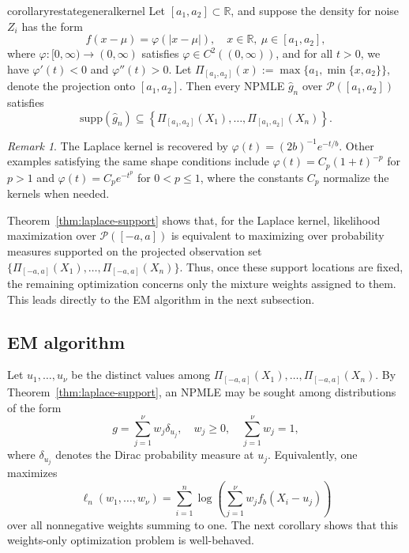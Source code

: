 \documentclass[english, 11pt]{article}
\newcommand{\supp}{\mathrm{supp}}
\theoremstyle{plain}
\theoremstyle{definition}
\theoremstyle{remark}
\newtheorem{remark}[theorem]{Remark}
\begin{document}
\begin{restatable}{corollary}{restategeneralkernel}\label{cor:general-kernel-support}
Let $[a_1,a_2]\subset\mathbb R$, and suppose the density for noise $Z_i$ has the form
\begin{equation*}
f(x-\mu)=\varphi(|x-\mu|), \quad x\in\mathbb R,\ \mu\in[a_1,a_2],
\end{equation*}
where $\varphi:[0,\infty)\to(0,\infty)$ satisfies $\varphi\in C^2((0,\infty))$, and for all $t>0$, we have
$\varphi'(t)<0$ and $\varphi''(t)>0$. Let $\Pi_{[a_1,a_2]}(x):=\max\{a_1,\min\{x,a_2\}\}$, denote the projection onto $[a_1,a_2]$. Then every NPMLE $\widehat g_n$ over $\mathcal P([a_1,a_2])$ satisfies
\begin{equation*}
\supp(\widehat g_n)\subseteq \left\{\Pi_{[a_1,a_2]}(X_1),\dots,\Pi_{[a_1,a_2]}(X_n)\right\}.
\end{equation*}
\end{restatable}

\begin{remark}
The Laplace kernel is recovered by $\varphi(t)=(2b)^{-1}e^{-t/b}$.
Other examples satisfying the same shape conditions include
$\varphi(t)=C_p(1+t)^{-p}$ for $p>1$ and
$\varphi(t)=C_p e^{-t^p}$ for $0<p\le 1$,
where the constants $C_p$ normalize the kernels when needed.
\end{remark}

Theorem~\ref{thm:laplace-support} shows that, for the Laplace kernel, likelihood maximization over $\mathcal P([-a,a])$ is equivalent to maximizing over probability measures supported on the projected observation set $\{\Pi_{[-a,a]}(X_1),\dots,\Pi_{[-a,a]}(X_n)\}$.
Thus, once these support locations are fixed, the remaining optimization concerns only the mixture weights assigned to them. This leads directly to the EM algorithm in the next subsection.

\subsection{EM algorithm}

Let $u_1,\dots,u_{\nu}$ be the distinct values among $\Pi_{[-a,a]}(X_1),\ldots,\Pi_{[-a,a]}(X_n)$.
By Theorem~\ref{thm:laplace-support}, an NPMLE may be sought among distributions of the form
\begin{equation*}
g=\sum_{j=1}^{\nu} w_j\delta_{u_j}, \quad w_j\ge 0,\quad \sum_{j=1}^{\nu} w_j=1,
\end{equation*}
where $\delta_{u_j}$ denotes the Dirac probability measure at $u_j$.
Equivalently, one maximizes
\begin{equation}\label{eq:finite-loglik}
\ell_n(w_1,\dots,w_{\nu})=\sum_{i=1}^n\log \left(\sum_{j=1}^{\nu} w_j f_b(X_i-u_j)\right)
\end{equation}
over all nonnegative weights summing to one. 
The next corollary shows that this weights-only optimization problem is well-behaved.
\end{document}
